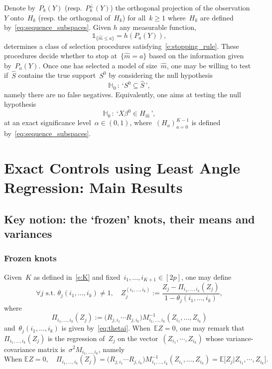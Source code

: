 \documentclass[final,numbib]{imaiai}%
\numberwithin{equation}{section}
\def\eq{\begin{equation}}
\def\qe{\end{equation}}
\def\bbE{\mathds{E}}
\renewcommand{\hat}{\widehat}
\newcommand{\<}{\langle}
\renewcommand{\>}{\rangle}
\newcommand{\1}{\mathds{1}}
\begin{document}
{Denote by~$P_k(Y)$ (resp.~$P^\perp_k(Y)$) the orthogonal projection of the observation~$Y$ onto~$H_k$ (resp. the orthogonal of~$H_k$) for all~$k\geq 1$ where~$H_k$ are defined by~\eqref{eq:sequence_subspaces}. Given $h$ any measurable function, 
\[
\mathds 1_{\{\hat m\leq a\}}=h(P_a(Y)),
\]
determines a class of selection procedures satisfying~\eqref{e:stopping_rule}. These procedures decide whether to stop at~$\{\hat m=a\}$ based on the information given by~$P_a(Y)$. Once one has selected a model of size~$\hat m$, one may be willing to test if~$\hat S$ contains the true support~$S^0$ by considering the null hypothesis 
\[
\mathds H_0\,:\ \text{‘}S^0\subseteq \hat S\,\text{'},
\] 
namely there are no false negatives.
Equivalently, one aims at testing the null hypothesis
\eq
\label{e:nullH}
\mathds H_0\,:\ \text{‘}X\beta^0\in H_{\hat m}\,\text{'},
\qe
at an exact significance level~$\alpha\in(0,1)$, where~$(H_a)_{a=0}^{K-1}$ is defined by~\eqref{eq:sequence_subspaces}.

\section{Exact Controls using Least Angle Regression: Main Results} 
\label{sec3}

\subsection{Key notion: the ‘frozen' knots, their means and variances}
\label{sec:frozen_knots}

\subsubsection{Frozen knots}
Given~$K$ as defined in~\eqref{e:K} and fixed~$i_1,\ldots, i_{K+1}\in[2p]$, one may define
\begin{equation} \label{e:frozenZ}
\forall j \text{ s.t. } \theta_j(i_1, \ldots, i_{k})\neq1,\quad 
Z^{(i_1,\ldots, i_{k})}_j:=\frac{Z_j-\Pi_{ i_1,\ldots, i_{k}} (Z_j)}{1-\theta_j(i_1,\ldots, i_{k})},
\end{equation}
where
\eq
\label{e:Pi}
\Pi_{ i_1,\ldots, i_{k}} (Z_j) :=  \big(R_{j,i_1} \cdots R_{j,i_{k}}  \big)M^{-1}_{i_1,\ldots, i_{k}}  (Z_{i_1}, \ldots, Z_{i_{k}})
\qe
and~$\theta_j(i_1, \ldots, i_{k})$ is given by~\eqref{eq:thetai}. When~$\bbE Z=0$, one may remark that~$\Pi_{ i_1,\ldots, i_{k}} (Z_j)$ is the regression of~$Z_j$ on the vector~$ (Z_{i_1}, \cdots , Z_{i_{k}})$ whose variance-covariance matrix is~$\sigma^2M_{i_1,\ldots, i_{k}}$, namely
\[
\text{When~}\bbE Z=0,\quad
\Pi_{ i_1,\ldots, i_{k}} (Z_j)=\big(R_{j,i_1} \cdots R_{j,i_{k}}  \big)M^{-1}_{i_1,\ldots, i_{k}}   (Z_{i_1}, \ldots, Z_{i_{k}})=\mathds E\big[Z_j| Z_{i_1}, \cdots , Z_{i_{k}}\big].
\]

}
\end{document}
